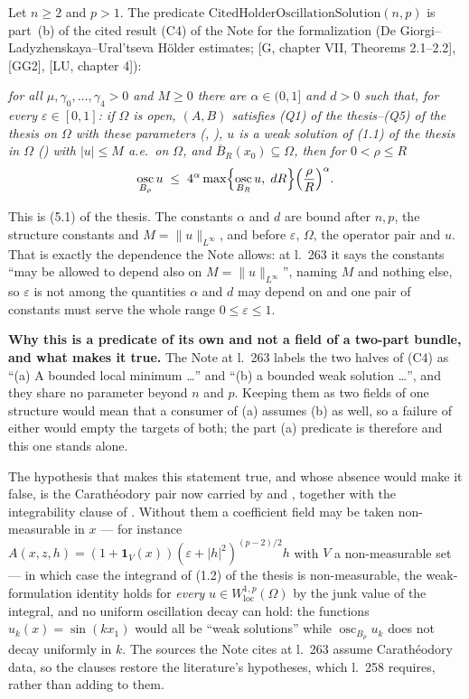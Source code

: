 \begin{definition}
Let $n\ge2$ and $p>1$.  The predicate
$\mathrm{CitedHolderOscillationSolution}(n,p)$ is part~(b) of the cited result
(C4) of the Note for the formalization (De
Giorgi--Ladyzhenskaya--Ural'tseva H\"older estimates;
[G, chapter VII, Theorems 2.1--2.2], [GG2], [LU, chapter 4]):

\emph{for all $\mu,\gamma_0,\dots,\gamma_4>0$
and $M\ge0$ there are $\alpha\in(0,1]$ and $d>0$ such that, for every
$\varepsilon\in[0,1]$: if $\Omega$ is open, $(A,B)$ satisfies
(Q1) of the thesis--(Q5) of the thesis on $\Omega$ with these parameters
(, ), $u$ is a weak
solution of (1.1) of the thesis in $\Omega$ () with
$|u|\le M$ a.e.\ on $\Omega$, and $\overline B_R(x_0)\subseteq\Omega$, then for
$0<\rho\le R$}
\[
\operatorname*{osc}_{B_\rho}u\;\le\;4^\alpha\max\Bigl\{\operatorname*{osc}_{B_R}u,\;dR\Bigr\}\Bigl(\frac\rho R\Bigr)^\alpha .
\]

This is (5.1) of the thesis.  The constants $\alpha$ and $d$
are bound after $n,p$, the structure constants and $M=\|u\|_{L^\infty}$, and
before $\varepsilon$, $\Omega$, the operator pair and $u$.  That is exactly the
dependence the Note allows: at l.~263 it says the constants ``may be allowed to
depend also on $M=\|u\|_{L^\infty}$'', naming $M$ and nothing else, so
$\varepsilon$ is not among the quantities $\alpha$ and $d$ may depend on and
one pair of constants must serve the whole range $0\le\varepsilon\le1$.

\medskip
\noindent\textbf{Why this is a predicate of its own and not a field of a
two-part bundle, and what makes it true.}  The Note at l.~263 labels the two
halves of (C4) as ``(a) A bounded local minimum \ldots'' and ``(b) a bounded
weak solution \ldots'', and they share no parameter beyond $n$ and $p$.  Keeping
them as two fields of one structure would mean that a consumer of (a) assumes
(b) as well, so a failure of either would empty the targets of both; the part
(a) predicate is therefore  and this one
stands alone.

The hypothesis that makes this statement true, and whose absence would make it
false, is the Carath\'eodory pair now carried by
 and , together
with the integrability clause of .  Without them a
coefficient field may be taken non-measurable in $x$ --- for instance
$A(x,z,h)=(1+\mathbf1_V(x))(\varepsilon+|h|^2)^{(p-2)/2}h$ with $V$ a
non-measurable set --- in which case the integrand of (1.2) of the thesis is
non-measurable, the weak-formulation identity holds for \emph{every}
$u\in W^{1,p}_{\mathrm{loc}}(\Omega)$ by the junk value of the integral, and no
uniform oscillation decay can hold: the functions $u_k(x)=\sin(kx_1)$ would all
be ``weak solutions'' while $\operatorname*{osc}_{B_\rho}u_k$ does not decay
uniformly in $k$.  The sources the Note cites at l.~263 assume Carath\'eodory
data, so the clauses restore the literature's hypotheses, which l.~258 requires,
rather than adding to them.


\end{definition}
